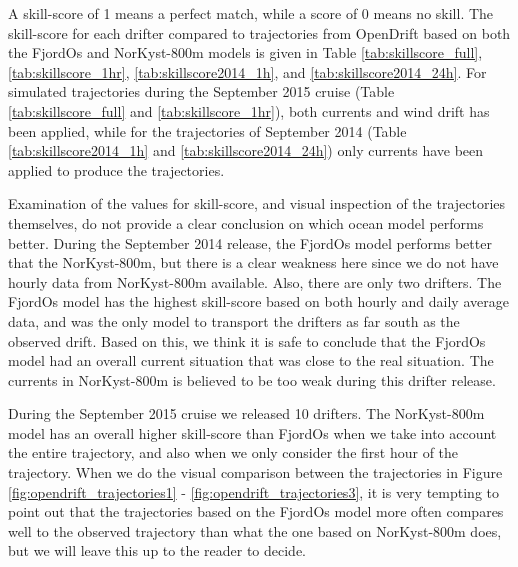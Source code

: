 A skill-score of 1 means a perfect match, while a score of 0 means no skill. %
The skill-score for each drifter compared to trajectories from OpenDrift based on both the FjordOs and NorKyst-800m models is given in Table \ref{tab:skillscore_full}, \ref{tab:skillscore_1hr}, \ref{tab:skillscore2014_1h}, and \ref{tab:skillscore2014_24h}. For simulated trajectories during the September 2015 cruise (Table \ref{tab:skillscore_full} and \ref{tab:skillscore_1hr}), both currents and wind drift has been applied, while for the trajectories of September 2014 (Table \ref{tab:skillscore2014_1h} and \ref{tab:skillscore2014_24h}) only currents have been applied to produce the trajectories.

Examination of the values for skill-score, and visual inspection of the trajectories themselves, do not provide a clear conclusion on which ocean model performs better. During the September 2014 release, the FjordOs model performs better that the NorKyst-800m, but there is a clear weakness here since we do not have hourly data from NorKyst-800m available. Also, there are only two drifters. The FjordOs model has the highest skill-score based on both hourly and daily average data, and was the only model to transport the drifters as far south as the observed drift. Based on this, we think it is safe to conclude that the FjordOs model had an overall current situation that was close to the real situation. The currents in NorKyst-800m is believed to be too weak during this drifter release.

During the September 2015 cruise we released 10 drifters. The NorKyst-800m model has an overall higher skill-score than FjordOs when we take into account the entire trajectory, and  also when we only consider the first hour of the trajectory. When we do the visual comparison between the trajectories in Figure \ref{fig:opendrift_trajectories1} - \ref{fig:opendrift_trajectories3}, it is very tempting to point out that the trajectories based on the FjordOs model more often compares well to the observed trajectory than what the one based on NorKyst-800m does, but we will leave this up to the reader to decide.


